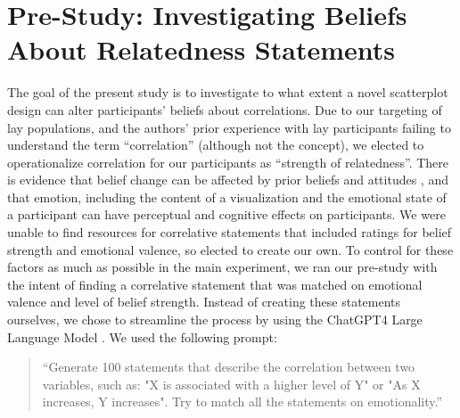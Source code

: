 \documentclass[sigconf]{acmart}
\begin{document}
\section{Pre-Study: Investigating Beliefs About Relatedness
Statements}\label{sec-pre-study}

The goal of the present study is to investigate to what extent a novel
scatterplot design can alter participants' beliefs about correlations.
Due to our targeting of lay populations, and the authors' prior
experience with lay participants failing to understand the term
``correlation'' (although not the concept), we elected to operationalize
correlation for our participants as ``strength of relatedness''. There
is evidence that belief change can be affected by prior beliefs and
attitudes \citep{xiong_2022, markant_2023}, and that emotion, including
the content of a visualization \citep{phelps_2006, harrison_2013} and
the emotional state of a participant \citep{thoresen_2016} can have
perceptual and cognitive effects on participants. We were unable to find
resources for correlative statements that included ratings for belief
strength and emotional valence, so elected to create our own. To control
for these factors as much as possible in the main experiment, we ran our
pre-study with the intent of finding a correlative statement that was
matched on emotional valence and level of belief strength. Instead of
creating these statements ourselves, we chose to streamline the process
by using the ChatGPT4 Large Language Model \citep{chat_gpt}. We used the
following prompt:

\begin{quotation}
    ``Generate 100 statements that describe the correlation between two variables, such as:
     "X is associated with a higher level of Y" or
     "As X increases, Y increases".
    Try to match all the statements on emotionality.''
    
\end{quotation}
\end{document}
